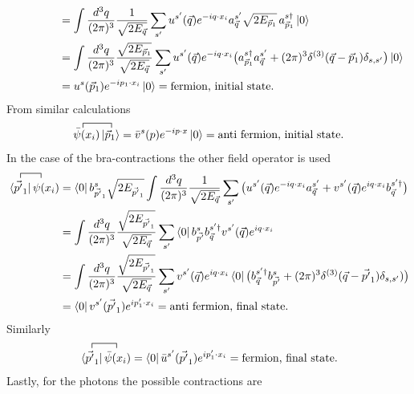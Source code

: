 \begin{example}
\begin{equation}
\begin{split}
			&\qquad\qquad=\int\frac{d^3q}{(2\pi)^3}\frac{1}{\sqrt{2E_{\vec{q}}}}\sum_{s'}u^{s'}(\vec{q})e^{-iq\cdot x_i}a^{s'}_{\vec{q}}\sqrt{2E_{\vec{p}_1}}\,a^{s\dagger}_{\vec{p}_1}\ket{0}\\
			&\qquad\qquad=\int\frac{d^3q}{(2\pi)^3}\frac{\sqrt{2E_{\vec{p}_1}}}{\sqrt{2E_{\vec{q}}}}\sum_{s'}u^{s'}(\vec{q})e^{-iq\cdot x_i}\big(a^{s\dagger}_{\vec{p}_1}a^{s'}_{\vec{q}}+(2\pi)^3\delta^{(3)}(\vec{q}-\vec{p}_1)\delta_{s,s'}\big)\ket{0}\\
			&\qquad\qquad=u^{s}(\vec{p}_1)e^{-ip_1\cdot x_i}\ket{0}=\text{fermion, initial state}.
		\end{split}
	\end{equation} 
	From similar calculations
	\begin{equation}
		\contraction{0}{\psi}{(x_i)}{\vec{p}_1}
		\bar{\psi}(x_i)\ket{\vec{p}_1}=\bar{v}^s(p)e^{-ip\cdot x}\ket{0}=\text{anti fermion, initial state}.
	\end{equation} 
	In the case of the bra-contractions the other field operator is used
	\begin{equation}
		\begin{split}
			\contraction{0}{\vec{p'}_1}{\psi}{(x}
			\bra{\vec{p'}_1}\psi(x_i)&=\bra{0}b^{s}_{\vec{p'}_1}\sqrt{2E_{\vec{p'}_1}}\int\frac{d^3q}{(2\pi)^3}\frac{1}{\sqrt{2E_{\vec{q}}}}\sum_{s'}\big(u^{s'}(\vec{q})e^{-iq\cdot x_i}a^{s'}_{\vec{q}}+v^{s'}(\vec{q})e^{iq\cdot x_i}b^{s'\dagger}_{\vec{q}}\big)\\
			&=\int\frac{d^3q}{(2\pi)^3}\frac{\sqrt{2E_{\vec{p'}_1}}}{\sqrt{2E_{\vec{q}}}}\sum_{s'}\bra{0}b^{s}_{\vec{p'}}b^{s'\dagger}_{\vec{q}}v^{s'}(\vec{q})e^{iq\cdot x_i}\\
			&=\int\frac{d^3q}{(2\pi)^3}\frac{\sqrt{2E_{\vec{p'}_1}}}{\sqrt{2E_{\vec{q}}}}\sum_{s'}v^{s'}(\vec{q})e^{iq\cdot x_i}\bra{0}\big(b^{s'\dagger}_{\vec{q}}b^{s}_{\vec{p'}}+(2\pi)^3\delta^{(3)}(\vec{q}-\vec{p'}_1)\delta_{s,s'})\big)\\
			&=\bra{0}v^{s'}(\vec{p'}_1)e^{ip'_1\cdot x_i}=\text{anti fermion, final state}.
		\end{split}
	\end{equation} 
	Similarly
	\begin{equation}
		\contraction{0}{\vec{p'}_1}{\psi}{(x_i)}
		\bra{\vec{p'}_1}\bar{\psi}(x_i)=\bra{0}\bar{u}^{s'}(\vec{p'}_1)e^{ip'_1\cdot x_i}=\text{fermion, final state}.
	\end{equation} 
	Lastly, for the photons the possible contractions are
	\begin{equation}
		\begin{split}

\end{split}
\end{equation}
\end{example}
